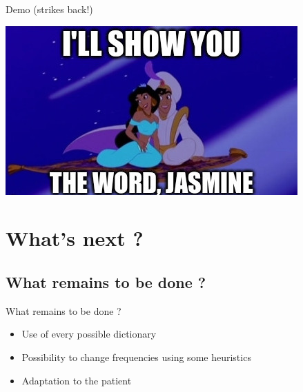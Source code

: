 \documentclass[graphics]{beamer}
\begin{document}
\begin{frame}{Demo (strikes back!)}
	\begin{center}
		\includegraphics[scale=0.6]{aladdin2}
	\end{center}
\end{frame}




\section{What's next ?}

\subsection{What remains to be done ?}

\begin{frame}{What remains to be done ?}
	\begin{center}
		\begin{itemize}
			\item Use of every possible dictionary
			\item Possibility to change frequencies using some heuristics
			\item Adaptation to the patient
		\end{itemize}
	\end{center}
\end{frame}
\end{document}
